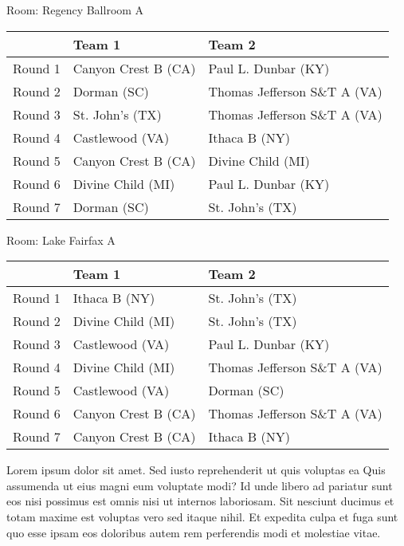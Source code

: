 \documentclass{article}%
\begin{document}
\vspace*{8pt}%
\linebreak%
\begin{flushleft}%
\begin{Large}%
Room: Regency Ballroom A%
\end{Large}%
\end{flushleft}%
\begin{tabularx}{\textwidth}{|c|Y|Y|}%
\hline%
&Team 1&Team 2\\%
\hline%
Round 1&Canyon Crest B (CA)&Paul L. Dunbar (KY)\\%
Round 2&Dorman (SC)&Thomas Jefferson S\&T A (VA)\\%
Round 3&St. John's (TX)&Thomas Jefferson S\&T A (VA)\\%
Round 4&Castlewood (VA)&Ithaca B (NY)\\%
Round 5&Canyon Crest B (CA)&Divine Child (MI)\\%
Round 6&Divine Child (MI)&Paul L. Dunbar (KY)\\%
Round 7&Dorman (SC)&St. John's (TX)\\%
\hline%
\end{tabularx}%
\vspace*{8pt}%
\linebreak%
\begin{flushleft}%
\begin{Large}%
Room: Lake Fairfax A%
\end{Large}%
\end{flushleft}%
\begin{tabularx}{\textwidth}{|c|Y|Y|}%
\hline%
&Team 1&Team 2\\%
\hline%
Round 1&Ithaca B (NY)&St. John's (TX)\\%
Round 2&Divine Child (MI)&St. John's (TX)\\%
Round 3&Castlewood (VA)&Paul L. Dunbar (KY)\\%
Round 4&Divine Child (MI)&Thomas Jefferson S\&T A (VA)\\%
Round 5&Castlewood (VA)&Dorman (SC)\\%
Round 6&Canyon Crest B (CA)&Thomas Jefferson S\&T A (VA)\\%
Round 7&Canyon Crest B (CA)&Ithaca B (NY)\\%
\hline%
\end{tabularx}%
\vspace*{8pt}%
\linebreak%
\newline%
Lorem ipsum dolor sit amet. Sed iusto reprehenderit ut quis voluptas ea Quis assumenda ut eius magni eum voluptate modi? Id unde libero ad pariatur sunt eos nisi possimus est omnis nisi ut internos laboriosam. Sit nesciunt ducimus et totam maxime est voluptas vero sed itaque nihil. Et expedita culpa et fuga sunt quo esse ipsam eos doloribus autem rem perferendis modi et molestiae vitae.\newline%
\end{document}
